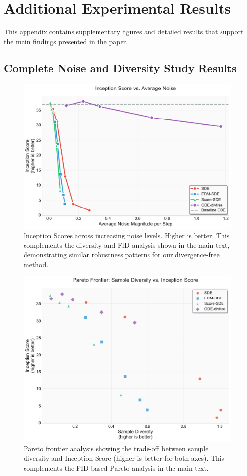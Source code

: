 \documentclass{article}
\begin{document}




\appendix

\section{Additional Experimental Results}

This appendix contains supplementary figures and detailed results that support the main findings presented in the paper.

\subsection{Complete Noise and Diversity Study Results}

\begin{figure}[H]
  \centering
  \includegraphics[width=0.7\linewidth]{figures/noise_study_is.pdf}
  \caption{Inception Scores across increasing noise levels. Higher is better. This complements the diversity and FID analysis shown in the main text, demonstrating similar robustness patterns for our divergence-free method.}
  \label{fig:is-noise}
\end{figure}

\begin{figure}[H]
  \centering
  \includegraphics[width=0.7\linewidth]{figures/pareto_diversity_vs_inception.pdf}
  \caption{Pareto frontier analysis showing the trade-off between sample diversity and Inception Score (higher is better for both axes). This complements the FID-based Pareto analysis in the main text.}
  \label{fig:pareto-inception}
\end{figure}
\end{document}
